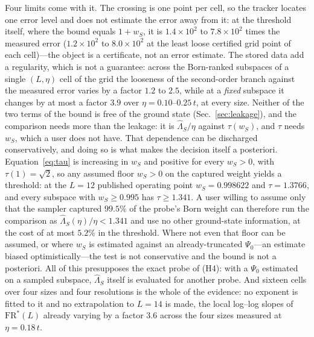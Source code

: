 %
%
%
%
%
%
%
%
%
%
%
%
Four limits come with it. The crossing is one point per cell, so the tracker locates one error
level and does not estimate the error away from it: at the threshold itself, where the bound equals $1+w_S$, it is
$1.4\times10^{2}$ to $7.8\times10^{2}$ times the measured error ($1.2\times10^{2}$ to $8.0\times10^{2}$ at the least loose certified
grid point of each cell)---the object is a certificate, not an error estimate. The stored data add a regularity, which is not a guarantee: across the Born-ranked subspaces of a single $(L,\eta)$ cell of the grid the looseness of the
second-order branch against the measured error varies by a factor $1.2$ to $2.5$, while at a \emph{fixed} subspace it changes by at most a factor $3.9$
over $\eta=0.10$--$0.25\,t$, at every size. Neither of the two terms of the bound is free of the ground state (Sec.~\ref{sec:leakage}), and the comparison
needs more than the leakage: it is
$\widehat\Lambda_S/\eta$ against $\tau(w_S)$, and $\tau$ needs $w_S$, which a user does not have.
That dependence can be discharged conservatively, and doing so is what makes the decision itself a
posteriori. Equation~\eqref{eq:tau} is increasing in $w_S$ and positive for every $w_S>0$, with $\tau(1)=\sqrt2$, so any assumed floor $w_S>0$ on the captured weight yields a threshold: at the $L=12$ published operating point
$w_S=0.998622$ and $\tau=1.3766$, and every subspace with $w_S\ge0.995$ has $\tau\ge1.341$. A user
willing to assume only that the sampler captured $99.5\%$ of the probe's Born weight can therefore
run the comparison as $\widehat\Lambda_S(\eta)/\eta<1.341$ and use no other ground-state
information, at the cost of at most $5.2\%$ in the threshold. Where not even that floor can be
assumed, or where $w_S$ is estimated against an already-truncated $\Psi_0$---an estimate biased
optimistically---the test is not conservative and the bound is not a posteriori. All of this presupposes the exact
probe of (H4): with a $\Psi_0$ estimated on a sampled subspace, $\widehat\Lambda_S$ itself is evaluated
for another probe.
And sixteen cells over four sizes and four resolutions is the whole of the evidence: no exponent is
fitted to it and no extrapolation to $L=14$ is made, the local log--log slopes of
$\mathrm{FR}^{\ast}(L)$ already varying by a factor $3.6$ across the four sizes measured at $\eta=0.18\,t$.

